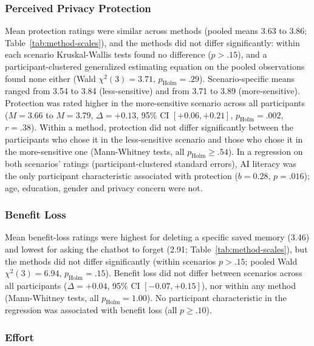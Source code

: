 \documentclass[conference,compsoc]{IEEEtran}
\begin{document}
\subsubsection{Perceived Privacy Protection}

Mean protection ratings were similar across methods (pooled means 3.63 to 3.86; Table~\ref{tab:method-scales}), and the methods did not differ significantly: within each scenario Kruskal-Wallis tests found no difference ($p>.15$), and a participant-clustered generalized estimating equation on the pooled observations found none either (Wald $\chi^2(3)=3.71$, $p_{\mathrm{Holm}}=.29$). Scenario-specific means ranged from 3.54 to 3.84 (less-sensitive) and from 3.71 to 3.89 (more-sensitive). Protection was rated higher in the more-sensitive scenario across all participants ($M=3.66$ to $M=3.79$, $\Delta=+0.13$, 95\% CI $[+0.06, +0.21]$, $p_{\mathrm{Holm}}=.002$, $r=.38$). Within a method, protection did not differ significantly between the participants who chose it in the less-sensitive scenario and those who chose it in the more-sensitive one (Mann-Whitney tests, all $p_{\mathrm{Holm}}\geq.54$). In a regression on both scenarios' ratings (participant-clustered standard errors), AI literacy was the only participant characteristic associated with protection ($b=0.28$, $p=.016$); age, education, gender and privacy concern were not.

\subsubsection{Benefit Loss}

Mean benefit-loss ratings were highest for deleting a specific saved memory (3.46) and lowest for asking the chatbot to forget (2.91; Table~\ref{tab:method-scales}), but the methods did not differ significantly (within scenarios $p>.15$; pooled Wald $\chi^2(3)=6.94$, $p_{\mathrm{Holm}}=.15$). Benefit loss did not differ between scenarios across all participants ($\Delta=+0.04$, 95\% CI $[-0.07, +0.15]$), nor within any method (Mann-Whitney tests, all $p_{\mathrm{Holm}}=1.00$). No participant characteristic in the regression was associated with benefit loss (all $p\geq.10$).

\subsubsection{Effort}
\label{sec:effort}
\end{document}
